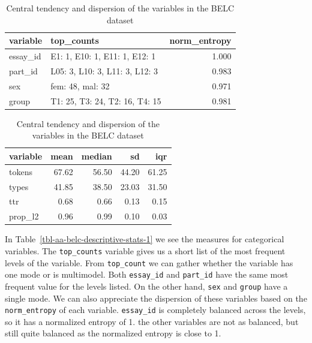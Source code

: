 \documentclass[
  letterpaper,
  DIV=11,
  numbers=noendperiod]{scrreport}
\theoremstyle{definition}
\theoremstyle{remark}
\begin{document}
\begin{table}

\caption{\label{tbl-aa-belc-descriptive-stats}Central tendency and
dispersion of the variables in the BELC
dataset}\begin{minipage}[t]{0.50\linewidth}

{\centering 

\tabularnewline

\centering
\begin{tabular}{l|l|r}
\hline
variable & top\_counts & norm\_entropy\\
\hline
essay\_id & E1: 1, E10: 1, E11: 1, E12: 1 & 1.000\\
\hline
part\_id & L05: 3, L10: 3, L11: 3, L12: 3 & 0.983\\
\hline
sex & fem: 48, mal: 32 & 0.971\\
\hline
group & T1: 25, T3: 24, T2: 16, T4: 15 & 0.981\\
\hline
\end{tabular}

}

\end{minipage}%
%
\begin{minipage}[t]{0.50\linewidth}

{\centering 

\tabularnewline

\centering
\begin{tabular}{l|r|r|r|r}
\hline
variable & mean & median & sd & iqr\\
\hline
tokens & 67.62 & 56.50 & 44.20 & 61.25\\
\hline
types & 41.85 & 38.50 & 23.03 & 31.50\\
\hline
ttr & 0.68 & 0.66 & 0.13 & 0.15\\
\hline
prop\_l2 & 0.96 & 0.99 & 0.10 & 0.03\\
\hline
\end{tabular}

}

\end{minipage}%

\end{table}

In Table~\ref{tbl-aa-belc-descriptive-stats-1} we see the measures for
categorical variables. The \texttt{top\_counts} variable gives us a
short list of the most frequent levels of the variable. From
\texttt{top\_count} we can gather whether the variable has one mode or
is multimodel. Both \texttt{essay\_id} and \texttt{part\_id} have the
same most frequent value for the levels listed. On the other hand,
\texttt{sex} and \texttt{group} have a single mode. We can also
appreciate the dispersion of these variables based on the
\texttt{norm\_entropy} of each variable. \texttt{essay\_id} is
completely balanced across the levels, so it has a normalized entropy of
1. the other variables are not as balanced, but still quite balanced as
the normalized entropy is close to 1.
\end{document}
